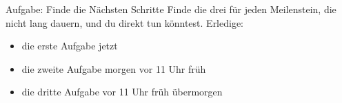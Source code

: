 \begin{frame}[c]
    \begin{block}{Aufgabe: Finde die Nächsten Schritte}
        Finde die drei  für jeden Meilenstein, die nicht lang
        dauern, und du direkt tun könntest. Erledige:
        \begin{itemize}
            \item die erste Aufgabe jetzt
            \item die zweite Aufgabe morgen vor 11 Uhr früh
            \item die dritte Aufgabe vor 11 Uhr früh übermorgen
        \end{itemize}
    \end{block}
\end{frame}


%
%
%
%
%
%

\fpause
